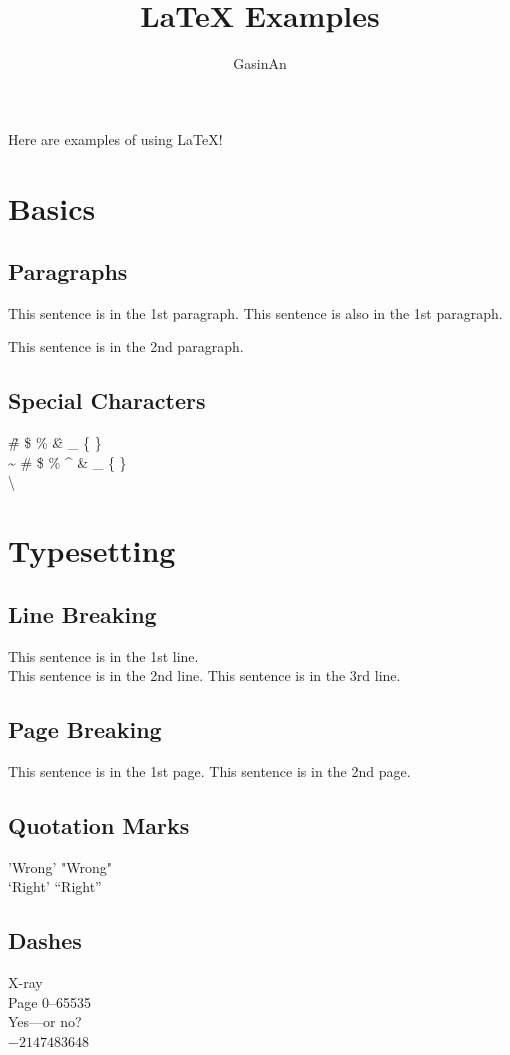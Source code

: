 \documentclass{article}
\title{\LaTeX{} Examples}
\author{GasinAn}
\begin{document}
    \maketitle
    Here are examples of using \LaTeX{}!
    \section{Basics}
    \subsection{Paragraphs}
    This sentence is in the 1st paragraph.
    This sentence is also in the 1st paragraph.

    This sentence is in the 2nd paragraph.
    \subsection{Special Characters}
    \~ \# \$ \% \^ \& \_ \{ \} \\ %
    \~{} \# \$ \% \^{} \& \_ \{ \} \\ \textbackslash %
    \section{Typesetting}
    \subsection{Line Breaking}
    This sentence is in the 1st line.\\
    This sentence is in the 2nd line.\newline
    This sentence is in the 3rd line.
    \subsection{Page Breaking}
    This sentence is in the 1st page.\newpage
    This sentence is in the 2nd page.
    \subsection{Quotation Marks}
    'Wrong' "Wrong"\\
    `Right' ``Right''
    \subsection{Dashes}
    X-ray\\
    Page 0--65535\\
    Yes---or no?\\
    $-2147483648$
\end{document}
